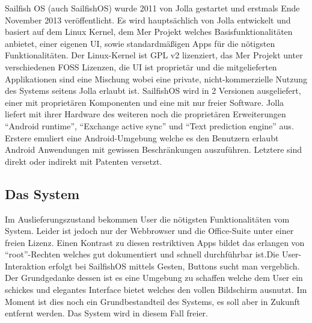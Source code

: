 Sailfish OS (auch \mbox{SailfishOS}) wurde 2011 von Jolla gestartet und erstmals Ende November 2013\thinspace\cite{online:jolla-about} veröffentlicht. Es wird hauptsächlich von Jolla entwickelt und basiert auf dem Linux Kernel, dem Mer Projekt welches Basisfunktionalitäten anbietet, einer eigenen UI, sowie standardmäßigen Apps für die nötigsten Funktionalitäten\thinspace\cite{online:sailfish-about}. Der Linux-Kernel ist GPL v2 lizenziert\thinspace\cite{online:kernel-license}, das Mer Projekt unter verschiedenen FOSS Lizenzen\thinspace\cite{online:mer-license}, die UI ist proprietär und die mitgelieferten Applikationen sind eine Mischung\thinspace\cite{online:sailfish-about} wobei eine private, nicht-kommerzielle Nutzung des Systems seitens Jolla erlaubt ist\thinspace\cite{online:sailfish-eula}. \mbox{SailfishOS} wird in 2 Versionen ausgeliefert, einer mit proprietären Komponenten und eine mit nur freier Software. Jolla liefert mit ihrer Hardware des weiteren noch die proprietären Erweiterungen\thinspace\cite{online:sailfish-about} ``Android runtime''\thinspace\cite{online:sailfish-android-runtime-licensor}, ``Exchange active sync''\thinspace\cite{online:microsoft-eas} und ``Text prediction engine''\thinspace\cite{online:jolla-xt9}\thinspace\cite{online:xt9-license} aus. Erstere emuliert eine Android-Umgebung welche es den Benutzern erlaubt Android Anwendungen mit gewissen Beschränkungen auszuführen\thinspace\cite{online:sailfish-android-runtime}. Letztere sind direkt oder indirekt mit Patenten versetzt.\\

\subsection{Das System}
Im Auslieferungszustand bekommen User die nötigsten Funktionalitäten vom System. Leider ist jedoch nur der Webbrowser und die Office-Suite unter einer freien Lizenz\thinspace\cite{online:sailfish-about}. Einen Kontrast zu diesen restriktiven Apps bildet das erlangen von ``root''-Rechten welches gut dokumentiert und schnell durchführbar ist\thinspace\cite{online:sailfish-root}.Die User-Interaktion erfolgt bei SailfishOS mittels Gesten, Buttons sucht man vergeblich. Der Grundgedanke dessen ist es eine Umgebung zu schaffen welche dem User ein schickes und elegantes Interface bietet welches den vollen Bildschirm ausnutzt\thinspace\cite{online:sailfish-ui}. Im Moment ist dies noch ein Grundbestandteil des Systems, es soll aber in Zukunft entfernt werden\thinspace\cite{online:sailfish-about}. Das System wird in diesem Fall freier. 

